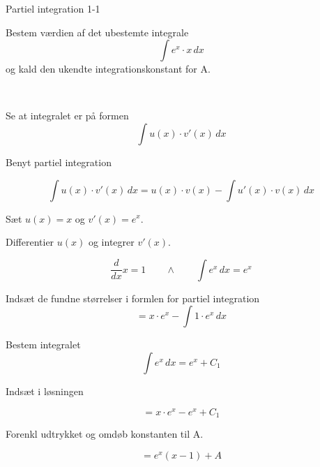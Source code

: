 \documentclass{article}
\begin{document}
\tableofcontents



\begin{exercise}{Partiel integration 1-1}
	
	
	Bestem værdien af det ubestemte integrale
	\[
	\int e^x \cdot x \, dx
	\]
	og kald den ukendte integrationskonstant for A.
	
	 \\
	
	
	\hint
	
	Se at integralet er på formen
	\[
	\int u(x) \cdot v'(x) \, dx
	\]
	
	\hint
	
	Benyt partiel integration
	
	\hint
	\[
	\int u(x) \cdot v'(x)\, dx = u(x) \cdot v(x) - \int u'(x) \cdot v(x) \, dx
	\]
	\hint
	
	Sæt $u(x) = x$ og $v'(x) = e^x$.
	
	
	\hint
	
	Differentier $u(x)$ og integrer $v'(x)$.
	
	\hint
	\[
	\frac{d}{dx}x = 1 \qquad \wedge \qquad \int e^x \, dx = e^x
	\]
	
	\hint
	
	Indsæt de fundne størrelser i formlen for partiel integration
	\[
	= x \cdot e^x - \int 1 \cdot e^x \, dx
	\]
	
	\hint
	
	Bestem integralet
	\[
	\int e^x \, dx = e^x + C_1
	\]
	
	\hint
	Indsæt i løsningen 
	
	\hint
	
	\[
	= x \cdot e^x - e^x + C_1
	\]
	
	\hint
	
	Forenkl udtrykket og omdøb konstanten til A.
	
	\hint
	
	\[
	= e^x(x - 1)  + A
	\]
	
	
\end{exercise}

\newpage
\end{document}
